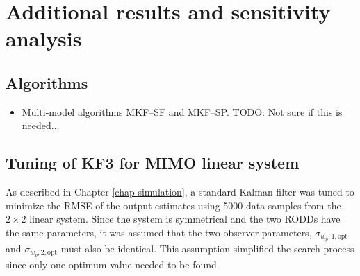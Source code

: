 \chapter{Additional results and sensitivity analysis}     %
\label{chap-Annex}                   %

\section{Algorithms} \label{sec:annex-alg-KF}

\begin{itemize}
	\item Multi-model algorithms MKF--SF and MKF--SP.  TODO: Not sure if this is needed...
\end{itemize}

\section{Tuning of KF3 for MIMO linear system} \label{sec:annex-sim-2-KF-tuning}

As described in Chapter \ref{chap-simulation}, a standard Kalman filter was tuned to minimize the \gls{RMSE} of the output estimates using 5000 data samples from the $2\times2$ linear system. Since the system is symmetrical and the two \gls{RODD}s have the same parameters, it was assumed that the two observer parameters, $\sigma_{w_p,1,\text{opt}}$ and $\sigma_{w_p,2,\text{opt}}$ must also be identical. This assumption simplified the search process since only one optimum value needed to be found.

